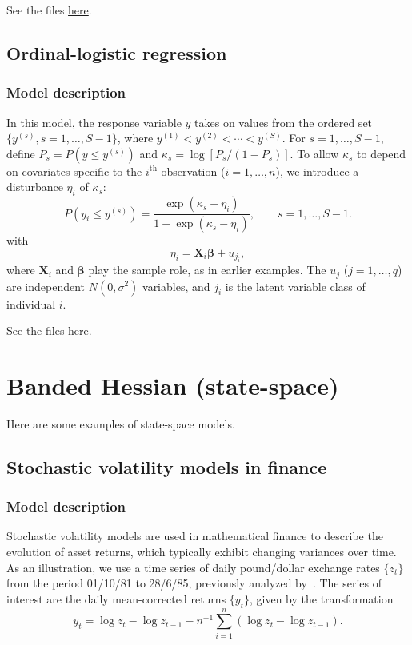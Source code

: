 \documentclass{admbmanual}
\newcommand{\citeasnoun}{\cite}
\begin{document}
See the files
\href{http://www.admb-project.org/otter-research/admbre/examples/weights/weights.html}{here}.

\subsection{Ordinal-logistic regression}
\label{sec:socatt_example}

\subsubsection{Model description}

In this model, the response variable $y$ takes on values from the ordered set
$\{y^{(s)},s=1,\ldots,S-1\}$, where $y^{(1)}<y^{(2)}<\cdots<y^{(S)}$. For
$s=1,\ldots,S-1$, define $P_s=P(y\leq y^{(s)})$ and $\kappa_s=\log
[P_s/(1-P_s)]$. To allow $\kappa_s$ to depend on covariates specific to the
$i^{\textrm{th}}$ observation ($i=1,\ldots,n$), we introduce a
disturbance $\eta_i$ of $\kappa_s$:
\[
P(y_i\leq y^{(s)}) =
\frac{\exp(\kappa_s-\eta_i)}
{1+\exp(\kappa_s-\eta_i)}, \qquad s=1,\ldots,S-1.
\]
with
\[
\eta_i = \mathbf{X}_i\mathbf{\beta}+u_{j_i},
\]
where $\mathbf{X}_i$ and $\mathbf{\beta}$ play the sample role, as in earlier
examples. %
The $u_j$ ($j=1,\ldots,q$) are independent $N(0,\sigma^2)$ variables, and $j_i$
is the latent variable class of individual $i$.

See the files
\href{http://www.admb-project.org/otter-research/admbre/examples/socatt/socatt.html}{here}.

\section{Banded Hessian (state-space)}

Here are some examples of state-space models.

\subsection{Stochastic volatility models in finance}

\subsubsection{Model description}

Stochastic volatility models are used in mathematical finance to describe the
evolution of asset returns, which typically exhibit changing variances over
time. As an illustration, we use a time series of daily pound/dollar exchange
rates $\{z_t\}$ from the period 01/10/81 to 28/6/85, previously analyzed
by~\citeasnoun{harv:ruiz:shep:1994}. The series of interest are the daily
mean-corrected returns $\{y_t\}$, given by the transformation
\[
y_t = \log z_t - \log z_{t-1} - n^{-1}\sum_{i=1}^n(\log z_t-\log z_{t-1}).
\]
\end{document}
